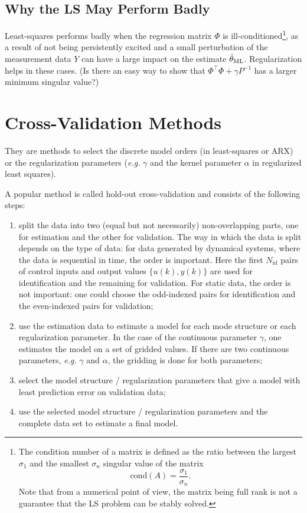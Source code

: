 \subsection{Why the LS May Perform Badly}
\label{sec:LS-illconditioned}

Least-squares performs badly when the regression matrix $\Phi$ is ill-conditioned\footnote{The condition number of a matrix is defined as the ratio between the largest $\sigma_1$ and the smallest $\sigma_n$ singular value of the matrix
  \begin{equation*}
    \textrm{cond}(A) = \frac{\sigma_1}{\sigma_n}.
  \end{equation*}
  Note that from a numerical point of view, the matrix being full rank is not a guarantee that the LS problem can be stably solved.}, as a result of not being persistently excited and a small perturbation of the measurement data $Y$ can have a large impact on the estimate $\hat{\theta}_\textrm{ML}$. Regularization helps in these cases. (Is there an easy way to show that $\Phi^\top\Phi + \gamma P^{-1}$ has a larger minimum singular value?)

\section{Cross-Validation Methods}
\label{sec:cross-validation}

They are methods to select the discrete model orders (in least-squares or ARX) or the regularization parameters (\textit{e.g.} $\gamma$ and the kernel parameter $\alpha$ in regularized least squares).

A popular method is called hold-out cross-validation and consists of the following steps:
\begin{enumerate}
\item split the data into two (equal but not necessarily) non-overlapping parts, one for estimation and the other for validation. The way in which the data is split depends on the type of data: for data generated by dynamical systems, where the data is sequential in time, the order is important. Here the first $N_\textrm{id}$ pairs of control inputs and output values $\{u(k),y(k)\}$ are used for identification and the remaining for validation. For static data, the order is not important: one could choose the odd-indexed pairs for identification and the even-indexed pairs for validation;
\item use the estimation data to estimate a model for each mode structure or each regularization parameter. In the case of the continuous parameter $\gamma$, one estimates the model on a set of gridded values. If there are two continuous parameters, \textit{e.g.} $\gamma$ and $\alpha$, the gridding is done for both parameters;
\item select the model structure / regularization parameters that give a model with least prediction error on validation data;
\item use the selected model structure / regularization parameters and the complete data set to estimate a final model.
\end{enumerate}

